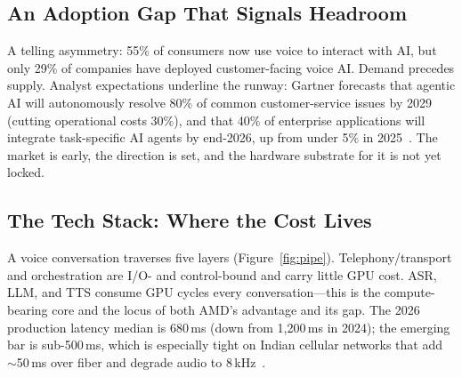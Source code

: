 \documentclass[blind]{gtac}
\begin{document}
\subsection{An Adoption Gap That Signals Headroom}

A telling asymmetry: 55\% of consumers now use voice to interact with AI, but only 29\% of companies have deployed customer-facing voice AI. Demand precedes supply. Analyst expectations underline the runway: Gartner forecasts that agentic AI will autonomously resolve 80\% of common customer-service issues by 2029 (cutting operational costs 30\%), and that 40\% of enterprise applications will integrate task-specific AI agents by end-2026, up from under 5\% in 2025~\cite{assemblyai_2026}. The market is early, the direction is set, and the hardware substrate for it is not yet locked.

\subsection{The Tech Stack: Where the Cost Lives}

A voice conversation traverses five layers (Figure~\ref{fig:pipe}). Telephony/transport and orchestration are I/O- and control-bound and carry little GPU cost. ASR, LLM, and TTS consume GPU cycles every conversation---this is the compute-bearing core and the locus of both AMD's advantage and its gap. The 2026 production latency median is 680\,ms (down from 1{,}200\,ms in 2024); the emerging bar is sub-500\,ms, which is especially tight on Indian cellular networks that add $\sim$50\,ms over fiber and degrade audio to 8\,kHz~\cite{assemblyai_stack}.
\end{document}
